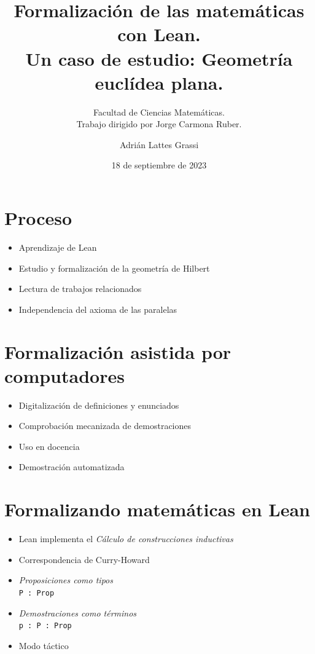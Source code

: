 \documentclass[t, aspectratio=169]{beamer}
\title{Formalización de las matemáticas con Lean.\\ Un caso de estudio: Geometría euclídea plana.}
\author{Adrián Lattes Grassi}
\date{18 de septiembre de 2023}
\subtitle{Facultad de Ciencias Matemáticas.\\Trabajo dirigido por Jorge Carmona Ruber.}
\begin{document}
\frame{\titlepage}

\section{Proceso}

\begin{frame}[fragile, c]
	\begin{itemize}[<+->]
		\item Aprendizaje de Lean
		\item Estudio y formalización de la geometría de Hilbert
		\item Lectura de trabajos relacionados
		\item Independencia del axioma de las paralelas
	\end{itemize}
\end{frame}


\section{Formalización asistida por computadores}

\begin{frame}[fragile, c]
	\begin{itemize}[<+->]
		\item Digitalización de definiciones y enunciados
		\item Comprobación mecanizada de demostraciones
		\item Uso en docencia
		\item Demostración automatizada
	\end{itemize}
\end{frame}

\section{Formalizando matemáticas en Lean}

\begin{frame}[fragile, c]
	\begin{itemize}[<+->]
		\item Lean implementa el \textit{Cálculo de construcciones inductivas}
		\item Correspondencia de Curry-Howard
		\item \textit{Proposiciones como tipos}\\
		      \lstinline{P : Prop}
		\item \textit{Demostraciones como términos}\\
		      \lstinline{p : P : Prop}
		\item Modo táctico
	\end{itemize}
\end{frame}
\end{document}
